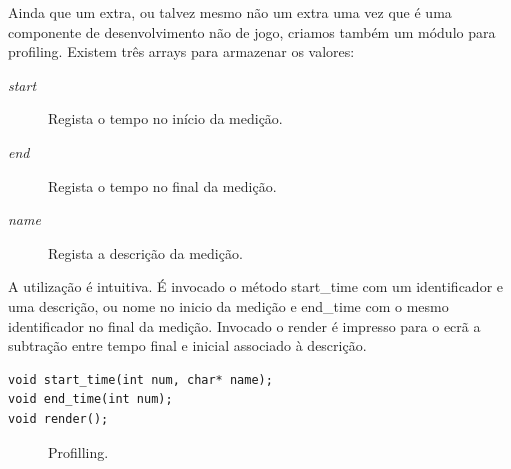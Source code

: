Ainda que um extra, ou talvez mesmo não um extra uma vez que é uma componente de desenvolvimento não de jogo, criamos também um módulo para profiling. Existem três arrays para armazenar os valores:

\begin{description}
\item[\textit{start}] Regista o tempo no início da medição.
\item[\textit{end}] Regista o tempo no final da medição.
\item[\textit{name}] Regista a descrição da medição.
\end{description}

A utilização é intuitiva. É invocado o método start\_time com um identificador e uma descrição, ou nome no inicio da medição e end\_time com o mesmo identificador no final da medição. Invocado o render é impresso para o ecrã a subtração entre tempo final e inicial associado à descrição.

\begin{lstlisting}[caption=Métodos para trabalhar com profiling.]
void start_time(int num, char* name);
void end_time(int num);
void render();
\end{lstlisting}

\begin{figure}[here]
                 \caption{Profilling.}
                 \label{fig:prototype}
\end{figure}
